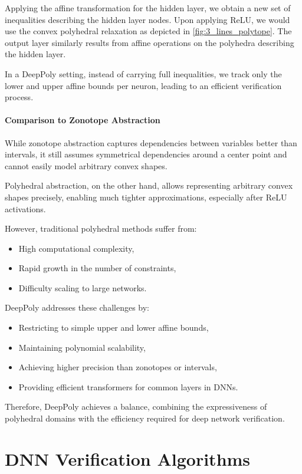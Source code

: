 \documentclass[oneside,11pt,dvipsnames]{book}
\begin{document}
Applying the affine transformation for the hidden layer, we obtain a new set of inequalities describing the hidden layer nodes. Upon applying ReLU, we would use the convex polyhedral relaxation as depicted in \autoref{fig:3_lines_polytope}. The output layer similarly results from affine operations on the polyhedra describing the hidden layer.

In a DeepPoly setting, instead of carrying full inequalities, we track only the lower and upper affine bounds per neuron, leading to an efficient verification process.

\subsection{Comparison to Zonotope Abstraction}

While zonotope abstraction captures dependencies between variables better than intervals, it still assumes symmetrical dependencies around a center point and cannot easily model arbitrary convex shapes.

Polyhedral abstraction, on the other hand, allows representing arbitrary convex shapes precisely, enabling much tighter approximations, especially after ReLU activations.

However, traditional polyhedral methods suffer from:
\begin{itemize}
    \item High computational complexity,
    \item Rapid growth in the number of constraints,
    \item Difficulty scaling to large networks.
\end{itemize}

DeepPoly addresses these challenges by:
\begin{itemize}
    \item Restricting to simple upper and lower affine bounds,
    \item Maintaining polynomial scalability,
    \item Achieving higher precision than zonotopes or intervals,
    \item Providing efficient transformers for common layers in DNNs.
\end{itemize}

Therefore, DeepPoly achieves a balance, combining the expressiveness of polyhedral domains with the efficiency required for deep network verification.




\part{DNN Verification Algorithms}
\end{document}
